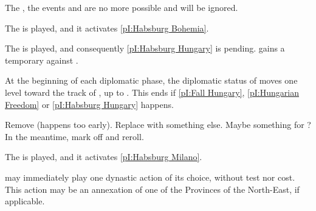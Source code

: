 \effetlong The , the events 
and  are no more possible and will be ignored.






\phevnt
\aparag The  is played, and it activates \ref{pI:Habsburg
  Bohemia}.






\phevnt
\aparag The  is played, and consequently \ref{pI:Habsburg
  Hungary} is pending.
\aparag \POL gains a temporary \CB against \paysHongrie.

\phdipl
\aparag At the beginning of each diplomatic phase, the diplomatic status of
\paysHongrie moves one level toward the track of \HAB, up to \EG. This ends if
\ref{pI:Fall Hungary}, \ref{pI:Hungarian Freedom} or \ref{pI:Habsburg Hungary}
happens.




\begin{todo}
  Remove (happens too early). Replace with something else. Maybe something for
  \DAN? In the meantime, mark off and reroll.
\end{todo}


\aparag The  is played, and it activates \ref{pI:Habsburg
  Milano}.




\phevnt
\aparag \SPA may immediately play one dynastic action of its choice, without
test nor cost.
\bparag This action may be an annexation of one of the Provinces of the
North-East, if applicable.



